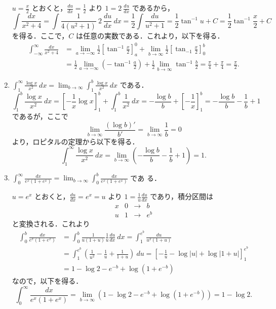 \documentclass[11pt, uplatex, dvipdfmx]{jsarticle}
\newcommand{\ds}{\displaystyle}
\begin{document}
\begin{enumerate}[(1)]
     $u=\frac{x}{2}$ とおくと，$\frac{du}{dx}=\frac{1}{2}$ より $1 = 2\ \frac{du}{dx}$ であるから，
     \[
       \int \frac{dx}{x^2+4} = \int \frac{1}{4(u^2+1)} \ 2\ \frac{du}{dx} \ dx = \frac{1}{2}\int \frac{du}{u^2+1}
       = \frac{1}{2} \tan^{-1} u +C = \frac{1}{2} \tan^{-1}\frac{x}{2} +C
     \]
     を得る．ここで，$C$ は任意の実数である．これより，以下を得る．
     \begin{align*}
       \int_{-\infty}^{\infty} \frac{dx}{x^2+4} 
       &= \lim_{a \to -\infty} \frac{1}{2} \left[ \tan^{-1} \frac{x}{2} \right]_{a}^{0}
         + \lim_{b \to \infty} \frac{1}{2} \left[ \tan_{-1} \frac{x}{2} \right]_{0}^{b}\\
       &= \frac{1}{2} \lim_{a \to -\infty} \left(-\tan^{-1}\frac{a}{2}\right)
         + \frac{1}{2} \lim_{b \to \infty} \tan^{-1} \frac{b}{2}=\frac{\pi}{4} + \frac{\pi}{4} = \frac{\pi}{2}.
     \end{align*}

   \item $\ds \int_{1}^{\infty}\frac{\log x}{x^2} \ dx = \lim_{b \to \infty} \int_{1}^{b} \frac{\log x}{x^2} \ dx$ である．
     \[
       \int_{1}^{b} \frac{\log x}{x^2} \ dx = \left[ -\frac{1}{x} \log x \right]_{1}^{b} + \int_{1}^{b} \frac{1}{x^2} \ dx
       = -\frac{\log b}{b} + \left[-\frac{1}{x}\right]_{1}^{b} = -\frac{\log b}{b} -\frac{1}{b} +1
     \]
     であるが，ここで
     \[
       \lim_{ b \to \infty} \frac{\left( \log b\right)'}{b'} = \lim_{b \to \infty} \frac{1}{b} = 0
     \]
     より，ロピタルの定理から以下を得る．
     \[
       \int_{1}^{\infty} \frac{\log x}{x^2} \ dx  = \lim_{b \to \infty} \left( -\frac{\log b}{b} - \frac{1}{b} +1\right) = 1.
     \]
     

   \item
     $\ds \int_{0}^{\infty} \frac{dx}{e^x (1+e^x)} = \lim_{b \to
       \infty} \int_{0}^{b} \frac{dx}{e^x\left(1+e^x\right)}$ であ
     る．

     \vspace{1zh}

     $u=e^{x}$ とおくと，$\frac{du}{dx}=e^{x}=u$ より
     $1 =\frac{1}{u}\frac{du}{dx}$ であり，積分区間は
     \[
       \begin{array}{c|ccc}
         x & 0 & \to & b\\ \hline
         u & 1 & \to & e^{b}
       \end{array}
     \]
     と変換される．これより
     \begin{align*}
       \int_{0}^{b} \frac{dx}{e^x(1+e^x)} 
       &= \int_{0}^{b} \frac{1}{u(1+u)} \frac{1}{u} \frac{du}{dx} \ dx
         = \int_{1}^{e^{b}} \frac{du}{u^2(1+u)}\\
       &= \int_{1}^{e^{b}} \left( \frac{1}{u^2} - \frac{1}{u} + \frac{1}{1+u} \right) \ du
         = \left[ -\frac{1}{u} - \log|u| + \log |1+u| \right]_{1}^{e^{b}}\\
       &=1- \log 2 - e^{-b} + \log \left(1+e^{-b}\right)
     \end{align*}
     なので，以下を得る．
     \[
       \int_{0}^{\infty} \frac{dx}{e^x (1+e^x)} = \lim_{b \to \infty} \left(1 - \log 2 -e^{-b} 
         + \log \left(1+e^{-b}\right) \right)= 1 - \log 2.
     \]
     

\end{enumerate}
\end{document}
